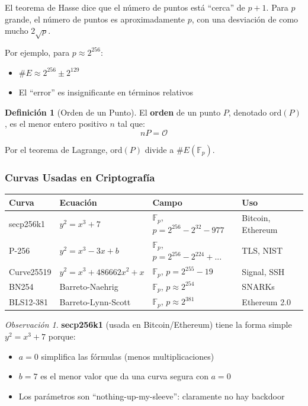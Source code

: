 \documentclass[11pt,a4paper,twoside,openright]{book}
\theoremstyle{definition}
\newtheorem{definition}{Definición}[chapter]
\theoremstyle{plain}
\theoremstyle{remark}
\newtheorem{remark}{Observación}[chapter]
\begin{document}
\begin{intuicion}
El teorema de Hasse dice que el número de puntos está ``cerca'' de $p + 1$. Para $p$ grande, el número de puntos es aproximadamente $p$, con una desviación de como mucho $2\sqrt{p}$.

Por ejemplo, para $p \approx 2^{256}$:
\begin{itemize}
    \item $\#E \approx 2^{256} \pm 2^{129}$
    \item El ``error'' es insignificante en términos relativos
\end{itemize}
\end{intuicion}

\begin{definition}[Orden de un Punto]
El \textbf{orden} de un punto $P$, denotado $\text{ord}(P)$, es el menor entero positivo $n$ tal que:
\[
nP = \mathcal{O}
\]

Por el teorema de Lagrange, $\text{ord}(P)$ divide a $\#E(\mathbb{F}_p)$.
\end{definition}

\subsubsection{Curvas Usadas en Criptografía}

\begin{center}
\begin{tabular}{llll}
\toprule
\textbf{Curva} & \textbf{Ecuación} & \textbf{Campo} & \textbf{Uso} \\
\midrule
secp256k1 & $y^2 = x^3 + 7$ & $\mathbb{F}_p$, $p = 2^{256} - 2^{32} - 977$ & Bitcoin, Ethereum \\
P-256 & $y^2 = x^3 - 3x + b$ & $\mathbb{F}_p$, $p = 2^{256} - 2^{224} + ...$ & TLS, NIST \\
Curve25519 & $y^2 = x^3 + 486662x^2 + x$ & $\mathbb{F}_p$, $p = 2^{255} - 19$ & Signal, SSH \\
BN254 & Barreto-Naehrig & $\mathbb{F}_p$, $p \approx 2^{254}$ & SNARKs \\
BLS12-381 & Barreto-Lynn-Scott & $\mathbb{F}_p$, $p \approx 2^{381}$ & Ethereum 2.0 \\
\bottomrule
\end{tabular}
\end{center}

\begin{remark}
\textbf{secp256k1} (usada en Bitcoin/Ethereum) tiene la forma simple $y^2 = x^3 + 7$ porque:
\begin{itemize}
    \item $a = 0$ simplifica las fórmulas (menos multiplicaciones)
    \item $b = 7$ es el menor valor que da una curva segura con $a = 0$
    \item Los parámetros son ``nothing-up-my-sleeve'': claramente no hay backdoor
\end{itemize}
\end{remark}
\end{document}
